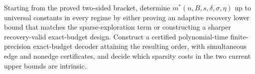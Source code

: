 Starting from the proved two-sided bracket, determine \(m^*(n,B,s,\delta,\sigma,\eta)\) up to universal constants in every regime by either proving an adaptive recovery lower bound that matches the sparse-exploration term or constructing a sharper recovery-valid exact-budget design. Construct a certified polynomial-time finite-precision exact-budget decoder attaining the resulting order, with simultaneous edge and nonedge certificates, and decide which sparsity costs in the two current upper bounds are intrinsic.